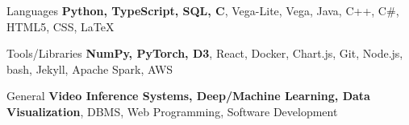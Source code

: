 

\begin{cvskills}

  \cvskill
    {Languages} %
    {{\bf Python, TypeScript, SQL, C}, Vega-Lite, Vega, Java, C++, C\#, HTML5, CSS, LaTeX} %

  \cvskill
    {Tools/Libraries} %
    {{\bf NumPy, PyTorch, D3}, React, Docker, Chart.js, Git, Node.js, bash, Jekyll, Apache Spark, AWS} %

  \cvskill
    {General} %
    {{\bf Video Inference Systems, Deep/Machine Learning, Data Visualization}, DBMS, Web Programming, Software Development} %


\end{cvskills}